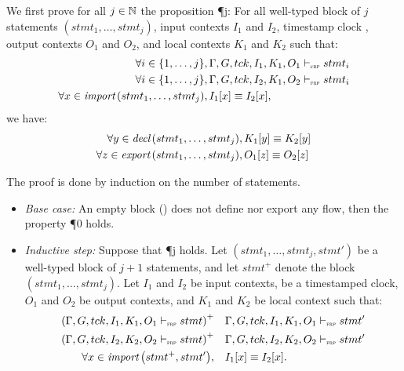 \begin{skippableproof}
    We first prove for all $j \in \N$ the proposition \P{j}: For all well-typed
    block of $j$ statements $(stmt_1, \dots, stmt_j)$, input contexts $I_1$ and $I_2$, timestamp
    clock \tck, output contexts $O_1$ and $O_2$, and local contexts $K_1$ and $K_2$ such that:
    \begin{align*}
        \forall i \in \{1, \dots, j\}, \,                   & \stmtDenot{\tck}{I_1}{K_1}{stmt_i}{O_1} \\
        \forall i \in \{1, \dots, j\}, \,                   & \stmtDenot{\tck}{I_2}{K_1}{stmt_i}{O_2} \\
        \forall x \in \importSet{stmt_1, \dots, stmt_j}, \, & I_1[x] \equiv I_2[x],
    \end{align*}
    we have:
    \begin{align*}
        \forall y \in \declSet{stmt_1, \dots, stmt_j}, \,   & K_1[y] \equiv K_2[y] \\
        \forall z \in \exportSet{stmt_1, \dots, stmt_j}, \, & O_1[z] \equiv O_2[z]
    \end{align*}

    The proof is done by induction on the number of statements.
    \begin{itemize}
        \item \textit{Base case:}
              An empty block (\skp) does not define nor export any flow, then the property
              \P{0} holds.

        \item \textit{Inductive step:}
              Suppose that \P{j} holds.
              Let $(stmt_1, \dots, stmt_j, stmt')$ be a well-typed block of $j+1$ statements, and
              let $stmt^+$ denote the block $(stmt_1, \dots, stmt_j)$.
              Let $I_1$ and $I_2$ be input contexts, \tck be a timestamped clock, $O_1$ and $O_2$ be
              output contexts, and $K_1$ and $K_2$ be local context such that:
              \begin{align*}
                  \left(\stmtDenot{\tck}{I_1}{K_1}{stmt}{O_1}\right)^+ &  &  & \stmtDenot{\tck}{I_1}{K_1}{stmt'}{O_1} \\
                  \left(\stmtDenot{\tck}{I_2}{K_2}{stmt}{O_2}\right)^+ &  &  & \stmtDenot{\tck}{I_2}{K_2}{stmt'}{O_2} \\
                  \forall x \in \importSet{stmt^+, stmt'},             &  &  & I_1[x] \equiv I_2[x].
              \end{align*}


\end{itemize}
\end{skippableproof}
